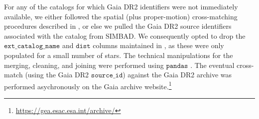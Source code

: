 \documentclass[12pt,modern,twocolumn,tighten]{aastex63}
\begin{document}
For any of the catalogs for which Gaia DR2 identifiers were not
immediately available, we either followed the spatial (plus
proper-motion) cross-matching procedures described in
\citet{bouma_cdipsI_2019}, or else we pulled the Gaia DR2 source
identifiers associated with the catalog from SIMBAD.  We consequently
opted to drop the $\texttt{ext\_catalog\_name}$ and $\texttt{dist}$
columns maintained in \citet{bouma_cdipsI_2019}, as these were only
populated for a small number of stars.
The technical manipulations for the merging, cleaning, and joining
were performed using $\texttt{pandas}$
\citep{mckinney-proc-scipy-2010}.  The eventual cross-match (using the
Gaia DR2 $\texttt{source\_id}$) against the Gaia DR2 archive was
performed asychronously on the Gaia archive
website.\footnote{\url{https://gea.esac.esa.int/archive/}}
\end{document}
